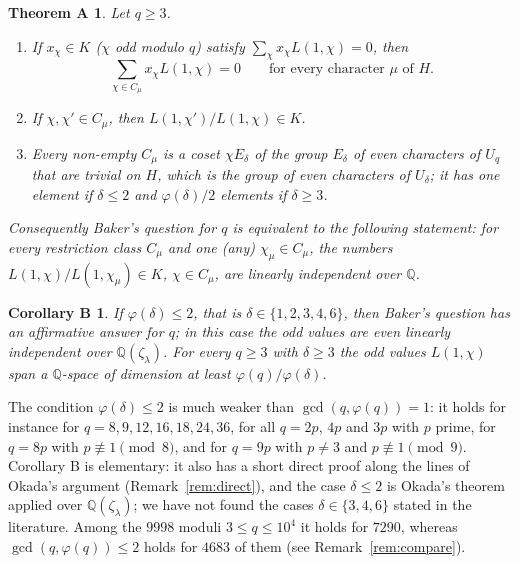 \documentclass[11pt]{amsart}
\newtheorem*{mainA}{Theorem A}
\newtheorem*{mainB}{Corollary B}
\theoremstyle{definition}
\theoremstyle{remark}
\providecommand{\Q}{\mathbb Q}
\numberwithin{equation}{section}
\begin{document}
\begin{mainA}
Let $q\ge3$.
\begin{enumerate}
\item If $x_\chi\in K$ ($\chi$ odd modulo $q$) satisfy $\sum_\chi x_\chi L(1,\chi)=0$, then
\[
\sum_{\chi\in C_\mu}x_\chi L(1,\chi)=0\qquad\text{for every character $\mu$ of $H$.}
\]
\item If $\chi,\chi'\in C_\mu$, then $L(1,\chi')/L(1,\chi)\in K$.
\item Every non-empty $C_\mu$ is a coset $\chi E_\delta$ of the group $E_\delta$ of even characters of $U_q$ that are trivial on $H$, which is the group of even characters of $U_\delta$; it has one element if $\delta\le2$ and $\varphi(\delta)/2$ elements if $\delta\ge3$.
\end{enumerate}
Consequently Baker's question for $q$ is equivalent to the following statement: for every restriction class $C_\mu$ and one (any) $\chi_\mu\in C_\mu$, the numbers $L(1,\chi)/L(1,\chi_\mu)\in K$, $\chi\in C_\mu$, are linearly independent over $\Q$.
\end{mainA}

\begin{mainB}
If $\varphi(\delta)\le2$, that is $\delta\in\{1,2,3,4,6\}$, then Baker's question has an affirmative answer for $q$; in this case the odd values are even linearly independent over $\Q(\zeta_{\lambda})$.
For every $q\ge3$ with $\delta\ge3$ the odd values $L(1,\chi)$ span a $\Q$-space of dimension at least $\varphi(q)/\varphi(\delta)$.
\end{mainB}

The condition $\varphi(\delta)\le2$ is much weaker than $\gcd(q,\varphi(q))=1$: it holds for instance for $q=8,9,12,16,18,24,36$, for all $q=2p,\,4p$ and $3p$ with $p$ prime, for $q=8p$ with $p\not\equiv1\pmod 8$, and for $q=9p$ with $p\ne3$ and $p\not\equiv1\pmod 9$.
Corollary B is elementary: it also has a short direct proof along the lines of Okada's argument (Remark~\ref{rem:direct}), and the case $\delta\le2$ is Okada's theorem applied over $\Q(\zeta_\lambda)$; we have not found the cases $\delta\in\{3,4,6\}$ stated in the literature.
Among the $9998$ moduli $3\le q\le 10^4$ it holds for $7290$, whereas $\gcd(q,\varphi(q))\le2$ holds for $4683$ of them (see Remark~\ref{rem:compare}).
\end{document}
